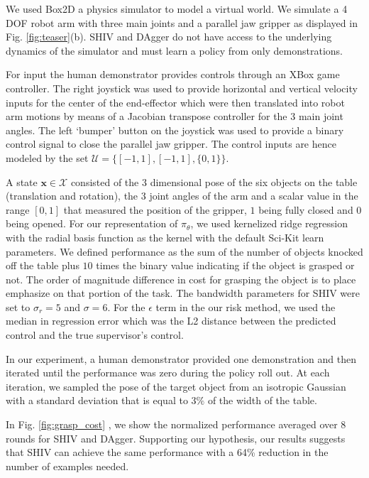 \documentclass[10pt, conference]{ieeeconf}      %
\newcommand{\bx}{\mathbf{x}}
\begin{document}
We used Box2D a physics simulator to model a virtual world. We simulate a 4 DOF robot arm with three main joints and a parallel jaw gripper as
displayed in Fig. \ref{fig:teaser}(b). SHIV and DAgger do not have access to the underlying dynamics of the simulator and must learn a policy from only demonstrations. 

For input the human demonstrator provides controls through an XBox game controller. The right joystick was used to
    provide horizontal and vertical velocity inputs for the center of the end-effector which were then translated into
robot arm motions by means of a Jacobian transpose controller for the 3 main joint angles. The left `bumper' button on the joystick was used to provide a binary control signal to close the parallel jaw
gripper. The control inputs are hence modeled by the set $\mathcal{U} = \lbrace [-1,1],[-1,1],\lbrace 0,1 \rbrace \rbrace$.  

A state $\bx\in \mathcal{X}$ consisted of the 3 dimensional pose of the six objects on the table (translation and rotation), the 3 joint angles of the arm and a scalar value in the range $[0,1]$ that measured the position of the gripper, $1$ being fully closed and $0$ being opened. For our representation of $\pi_{\theta}$, we used kernelized ridge regression with the radial basis function as the kernel with the default Sci-Kit learn parameters. We defined performance as the sum of the number of objects knocked off the table plus $10$ times the binary value indicating if the object is grasped or not. The order of magnitude difference in cost for grasping the object is to place emphasize on that portion of the task. The bandwidth parameters for SHIV were set to $\sigma_r = 5$ and $\sigma = 6$. For the $\epsilon$ term in the our risk method, we used the median in regression error which was the L2 distance between the predicted control and the true supervisor's control. 

In our experiment, a human demonstrator provided one demonstration and then iterated until the performance was zero during the policy roll out. At each iteration, we sampled the pose of the target object from an isotropic Gaussian with a standard deviation that is equal to $3\%$ of the width of the table. 

 In Fig. \ref{fig:grasp_cost} , we show the normalized performance averaged over 8 rounds for SHIV and DAgger. Supporting our hypothesis, our results suggests that SHIV can achieve the same performance with a 64\% reduction in the number of examples needed.
\end{document}
